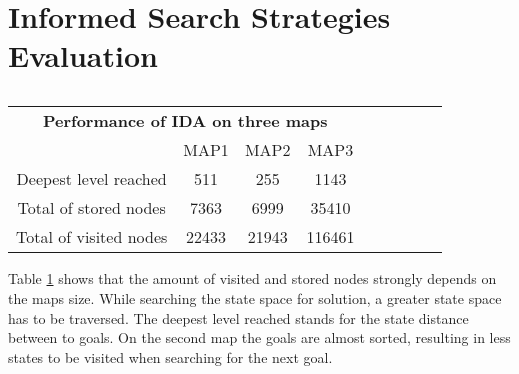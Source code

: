 \documentclass[a4paper,headsepline,12pt]{scrartcl}
\begin{document}
\section{Informed Search Strategies Evaluation}

\begin{table} [ht!]                                             
\centering                                                
\begin{tabular}{|c|c|c|c|c|c|c|c|c|}    

\multicolumn{4}{c}{ \textbf{Performance of IDA on three maps}}   \\                                           
\cline{1-4}                                                    
\multicolumn{1}{|c|}{} & MAP1 & MAP2 & MAP3  \\
\hline                                                    
Deepest level reached & 511 & 255 & 1143  \\ 
\hline                                                         
Total of stored nodes & 7363 & 6999 & 35410 \\
\hline                                                         
Total of visited nodes & 22433 & 21943 & 116461 \\ 
\hline
                                                 
\end{tabular}                                             
\caption{}                                  
\label{table:maps}                                
\end{table}  
Table \ref{table:maps} shows that the amount of visited and stored nodes strongly depends on the maps size. While searching the state space for solution, a greater state space has to be traversed. The deepest level reached stands for the state distance between to goals.  On the second map the goals are almost sorted, resulting in less states to be visited when searching for the next goal.
\end{document}
